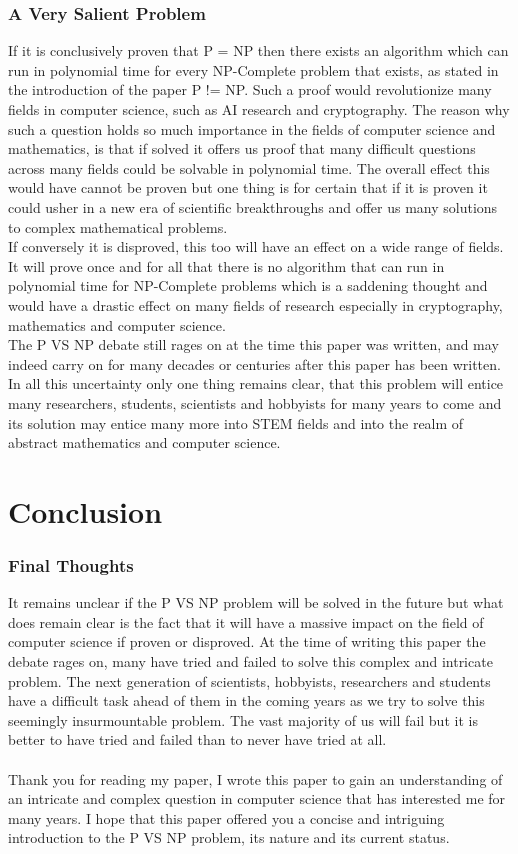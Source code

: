 \documentclass{report}
\begin{document}
\subsection{A Very Salient Problem}
If it is conclusively proven that P = NP then there exists an algorithm which can run in polynomial time for every NP-Complete problem that exists, as stated in the introduction of the paper P != NP\cite{P!=NP}.  Such a proof would revolutionize many fields in computer science, such as AI research and cryptography.  The reason why such a question holds so much importance in the fields of computer science and mathematics, is that if solved it offers us proof that many difficult questions across many fields could be solvable in polynomial time.  The overall effect this would have cannot be proven but one thing is for certain that if it is proven it could usher in a new era of scientific breakthroughs and offer us many solutions to complex mathematical problems.
\\
If conversely it is disproved, this too will have an effect on a wide range of fields.  It will prove once and for all that there is no algorithm that can run in polynomial time for NP-Complete problems which is a saddening thought and would have a drastic effect on many fields of research especially in cryptography, mathematics and computer science.
\\
The P VS NP debate still rages on at the time this paper was written, and may indeed carry on for many decades or centuries after this paper has been written.  In all this uncertainty only one thing remains clear, that this problem will entice many researchers, students, scientists and hobbyists for many years to come and its solution may entice many more into STEM fields and into the realm of abstract mathematics and computer science.
\chapter{Conclusion}
\subsection{Final Thoughts}
It remains unclear if the P VS NP problem will be solved in the future but what does remain clear is the fact that it will have a massive impact on the field of computer science if proven or disproved.  At the time of writing this paper the debate rages on, many have tried and failed to solve this complex and intricate problem.  The next generation of scientists, hobbyists, researchers and students have a difficult task ahead of them in the coming years as we try to solve this seemingly insurmountable problem.  The vast majority of us will fail but it is better to have tried and failed than to never have tried at all.
\\
\\
Thank you for reading my paper, I wrote this paper to gain an understanding of an intricate and complex question in computer science that has interested me for many years.  I hope that this paper offered you a concise and intriguing introduction to the P VS NP problem, its nature and its current status.


\end{document}
